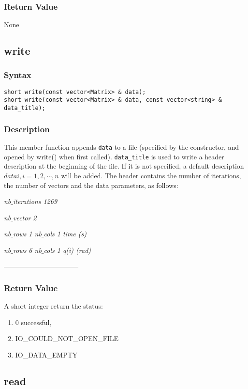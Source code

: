 \documentclass[dvips,11pt,fleqn]{report}
\begin{document}
\subsubsection*{Return Value}

None

\newpage

\subsection*{write}
\subsubsection*{Syntax}
\begin{verbatim}
short write(const vector<Matrix> & data);
short write(const vector<Matrix> & data, const vector<string> & data_title);
\end{verbatim}

\subsubsection*{Description}   
This member function appends \texttt{data} to a file (specified by the
constructor, and opened by write() when first called). 
\texttt{data\_title} is used to write a header description at the
beginning of the file. If it is not specified, a default 
description $datai, i=1,2,\cdots,n$ will be added. The header
contains the number of iterations,
the number of vectors and the data parameters, as follows:

\indent
\emph{nb$\_$iterations 1269}
 
\emph{nb$\_$vector 2} 

\emph{nb$\_$rows 1  nb$\_$cols 1  time (s)}

\emph{nb$\_$rows 6  nb$\_$cols 1  q(i) (rad)}

---------------------------------

\subsubsection*{Return Value}
A short integer return the status:
\begin{enumerate}
\item[] 0 successful, 
\item[] IO\_COULD\_NOT\_OPEN\_FILE
\item[] IO\_DATA\_EMPTY
\end{enumerate}
\newpage 

\subsection*{read}
\end{document}
